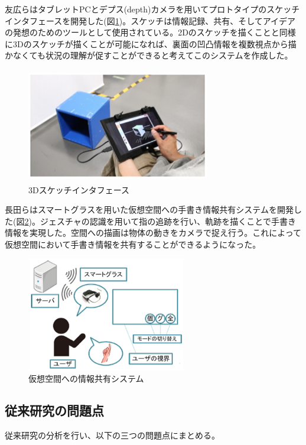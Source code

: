 \documentclass[11pt,a4j, titlepage]{jarticle} %
\begin{document}
友広ら\cite{tomohiro}はタブレットPCとデプス(depth)カメラを用いてプロトタイプのスケッチインタフェースを開発した(図\ref{fig:3dsketch})。スケッチは情報記録、共有、そしてアイデアの発想のためのツールとして使用されている。2Dのスケッチを描くことと同様に3Dのスケッチが描くことが可能になれば、裏面の凹凸情報を複数視点から描かなくても状況の理解が促すことができると考えてこのシステムを作成した。

\begin{figure}[H]
  \begin{center}
    \includegraphics[clip,height=5.0cm,width=8.0cm]{./3dsketch.eps}
    \caption{3Dスケッチインタフェース}
    \label{fig:3dsketch}
  \end{center}
\end{figure}

長田ら\cite{nagata}はスマートグラスを用いた仮想空間への手書き情報共有システムを開発した(図\ref{fig:kasoukuukan})。ジェスチャの認識を用いて指の追跡を行い、軌跡を描くことで手書き情報を実現した。空間への描画は物体の動きをカメラで捉え行う。これによって仮想空間において手書き情報を共有することができるようになった。

\begin{figure}[H]
  \begin{center}
    \includegraphics[clip,height=5.0cm,width=7.0cm]{./kasoukuukan.eps}
    \caption{仮想空間への情報共有システム}
    \label{fig:kasoukuukan}
  \end{center}
\end{figure}

\subsection{従来研究の問題点}
従来研究の分析を行い、以下の三つの問題点にまとめる。
\end{document}
